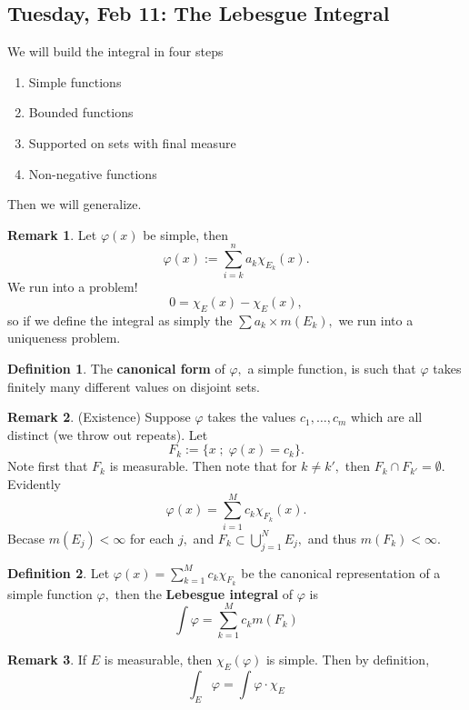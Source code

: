 \documentclass[10pt, oneside]{article}
\theoremstyle{definition}
\newtheorem{defn}{Definition}
\newtheorem{rem}{Remark}
\begin{document}
\subsection{Tuesday, Feb 11: The Lebesgue Integral}
We will build the integral in four steps
\begin{enumerate}
    \item Simple functions
    \item Bounded functions
    \item Supported on sets with final measure
    \item Non-negative functions
\end{enumerate}
Then we will generalize.
\begin{rem}
    Let $\varphi(x)$ be simple, then 
    \[\varphi(x) := \sum_{i=k}^n a_k \chi_{E_k}(x).\] 
    We run into a problem!
    \[0 = \chi_E(x) - \chi_E(x),\] so if we define the integral as simply the $\sum a_k \times m(E_k),$ we run into a uniqueness problem.
\end{rem}
\begin{defn}
    The \textbf{canonical form} of $\varphi,$ a simple function, is such that $\varphi$ takes finitely many different values on disjoint sets.
\end{defn}
\begin{rem}
    (Existence) Suppose $\varphi$ takes the values $c_1, \dots, c_m$ which are all distinct (we throw out repeats). Let \[F_k := \{x \; ; \; \varphi(x) = c_k\}.\] Note first that $F_k$ is measurable. Then note that for $k \neq k',$ then $F_k \cap F_{k'} = \emptyset.$ Evidently
    \[\varphi(x) = \sum_{i=1}^M c_k \chi_{F_k}(x).\] Becase $m(E_j) < \infty$ for each $j,$ and $F_k \subset \bigcup_{j=1}^N E_j,$ and thus $m(F_k) < \infty.$
\end{rem}
\begin{defn}
    Let $\varphi(x) = \sum_{k=1}^M c_k \chi_{F_k}$ be the canonical representation of a simple function $\varphi,$ then the \textbf{Lebesgue integral} of $\varphi$ is
    \[\int \varphi = \sum_{k=1}^M c_k m(F_k)\]
\end{defn}
\begin{rem}
    If $E$ is measurable, then $\chi_E(\varphi)$ is simple. Then by definition,
    \[\int_E\varphi = \int \varphi \cdot \chi_E\]
\end{rem}
\end{document}
